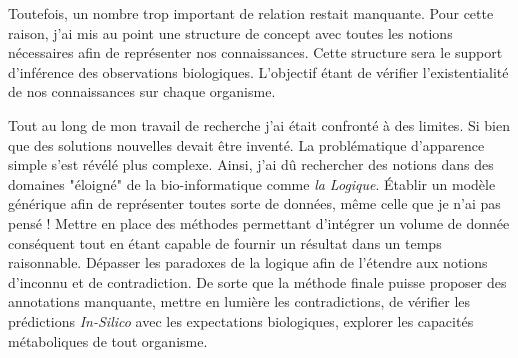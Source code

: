 \begin{refsection}
Toutefois, un nombre trop important de relation restait manquante. Pour cette raison, j'ai mis au point une structure de concept avec toutes les notions nécessaires afin de représenter nos connaissances. Cette structure sera le support d'inférence des observations biologiques. L'objectif étant de vérifier l'existentialité de nos connaissances sur chaque organisme.

Tout au long de mon travail de recherche j'ai était confronté à des limites. Si bien que des solutions nouvelles devait être inventé. La problématique d'apparence simple s'est révélé plus complexe. Ainsi, j'ai dû rechercher des notions dans des domaines "éloigné" de la bio-informatique comme \textit{la Logique}. Établir un modèle générique afin de représenter toutes sorte de données, même celle que je n'ai pas pensé !  Mettre en place des méthodes permettant d'intégrer un volume de donnée conséquent tout en étant capable de fournir un résultat dans un temps raisonnable. Dépasser les paradoxes de la logique afin de l'étendre aux notions d'inconnu et de contradiction. De sorte que la méthode finale puisse proposer des annotations manquante, mettre en lumière les contradictions, de vérifier les prédictions \textit{In-Silico} avec les expectations biologiques, explorer les capacités métaboliques de tout organisme.

\subbibliography
\end{refsection}